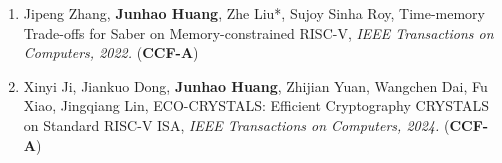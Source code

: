 \documentclass[letterpaper,11pt]{article}
\newlength{\outerbordwidth}
\newcommand{\resitem}[1]{\item #1 \vspace{-2pt}}
\newcommand{\resheading}[1]{\vspace{-5pt}%
  \parbox{\textwidth}{\setlength{\FrameSep}{\outerbordwidth}
    \begin{shaded}
\setlength{\fboxsep}{0pt}\framebox[\textwidth][l]{\setlength{\fboxsep}{4pt}\fcolorbox{shadecolorB}{shadecolorB}{\textbf{\sffamily{\mbox{~}\makebox[6.762in][l]{\large #1} \vphantom{p\^{E}}}}}}
    \end{shaded}
  }\vspace{-10pt}%
}
\begin{document}
\begin{enumerate}
	\item {Jipeng Zhang, \textbf{Junhao Huang}, Zhe Liu*, Sujoy Sinha Roy, Time-memory Trade-offs for Saber on Memory-constrained RISC-V, \textit{IEEE Transactions on Computers, 2022.} (\textbf{CCF-A})
	}
	
	\item {Xinyi Ji, Jiankuo Dong, \textbf{Junhao Huang}, Zhijian Yuan, Wangchen Dai, Fu Xiao, Jingqiang Lin, ECO-CRYSTALS: Efficient Cryptography CRYSTALS on Standard RISC-V ISA, \textit{IEEE Transactions on Computers, 2024.} (\textbf{CCF-A})
	}
\end{enumerate}

\end{document}
